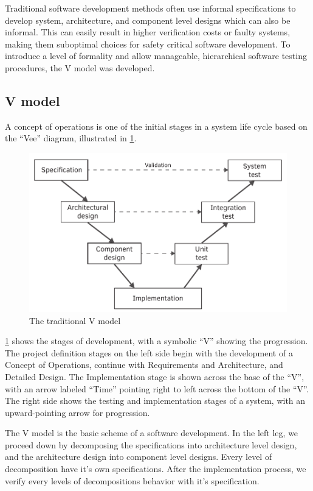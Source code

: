 Traditional software development methods often use informal specifications to develop system, architecture, and component level designs which can also be informal. This can easily result in higher verification costs or faulty systems, making them suboptimal choices for safety critical software development. To introduce a level of formality and allow manageable, hierarchical software testing procedures, the V model was developed.

\subsection{V model}

A concept of operations is one of the initial stages in a system life cycle based on the “Vee” diagram, illustrated in \cref{fig:intro:vmodel}.

\begin{figure}[h]
	\centering
	\includegraphics[width=0.8\linewidth]{include/figures/chapter_1/vmodel}
	\caption{The traditional V model \cite{vmodel}}
	\label{fig:intro:vmodel}
\end{figure}

\cref{fig:intro:vmodel} shows the stages of development, with a symbolic “V” showing the progression. The project definition stages on the left side begin with the development of a Concept of Operations, continue with Requirements and Architecture, and Detailed Design. The Implementation stage is shown across the base of the ``V'', with an arrow labeled ``Time'' pointing right to left across the bottom of the ``V''. The right side shows the testing and implementation stages of a system, with an upward-pointing arrow for progression. \cite{vmodel}

The V model is the basic scheme of a software development. In the left leg, we proceed down by decomposing the specifications into architecture level design, and the architecture design into component level designs. Every level of decomposition have it's own specifications. After the implementation process, we verify every levels of decompositions behavior with it's specification.


